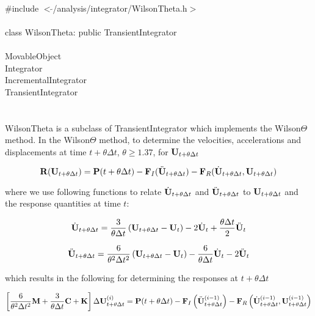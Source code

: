 
   \\
\indent \#include $<\tilde{ }$/analysis/integrator/WilsonTheta.h$>$  \\

  \\
\indent class WilsonTheta: public TransientIntegrator  \\

 \\
\indent MovableObject \\
\indent\indent Integrator \\
\indent\indent\indent IncrementalIntegrator \\
\indent\indent\indent\indent TransientIntegrator \\
\indent\indent\indent\indent{} \\

 \\ 
\indent WilsonTheta is a subclass of TransientIntegrator which implements
the Wilson$\Theta$ method. In the Wilson$\Theta$ method, to determine the 
velocities, accelerations and displacements at time $t + \theta \Delta
t$, $\theta \ge 1.37$, for ${\bf U}_{t+ \theta \Delta t}$ 

\[ {\bf R} ({\bf U}_{t + \theta \Delta t}) = {\bf P}(t + \theta \Delta t) -
{\bf F}_I(\ddot{\bf U}_{t+ \theta \Delta t}) 
- {\bf F}_R(\dot{\bf U}_{t + \theta \Delta t},{\bf U}_{t + \theta \Delta t}) \]

\noindent where we use following functions to relate $\dot{\bf U}_{t + \theta
\Delta t}$ and $\ddot{\bf U}_{t + \theta \Delta t}$ to ${\bf U}_{t + \theta \Delta
t}$ and the response quantities at time $t$:

\[
\dot {{\bf U}}_{t + \theta \Delta t} = \frac{3}{\theta \Delta t} \left(
{\bf U}_{t + \theta \Delta t} - {\bf U}_t \right)
 - 2 \dot {{\bf U}}_t + \frac{\theta \Delta t}{2} \ddot {{\bf U}}_t 
\]

\[
\ddot {{\bf U}}_{t + \theta \Delta t} = \frac{6}{\theta^2 \Delta t^2}
\left( {\bf U}_{t+\theta \Delta t} - {\bf U}_t \right)
 - \frac{6}{\theta \Delta t} \dot {{\bf U}}_t -2 \ddot{\bf U}_t
\]

\noindent which  results in the following for determining the responses at
$t + \theta \Delta t$ 

\[ \left[ \frac{6}{\theta^2 \Delta t^2} {\bf M} + \frac{3}{\theta \Delta t}
{\bf C} + {\bf K} \right] \Delta {\bf U}_{t + \theta \Delta t}^{(i)} = {\bf P}(t + \theta
\Delta t) - {\bf F}_I\left(\ddot{\bf U}_{t+\theta \Delta  t}^{(i-1)}\right) 
- {\bf F}_R\left(\dot{\bf U}_{t + \theta \Delta t}^{(i-1)},{\bf U}_{t + \theta \Delta
t}^{(i-1)}\right) \]


